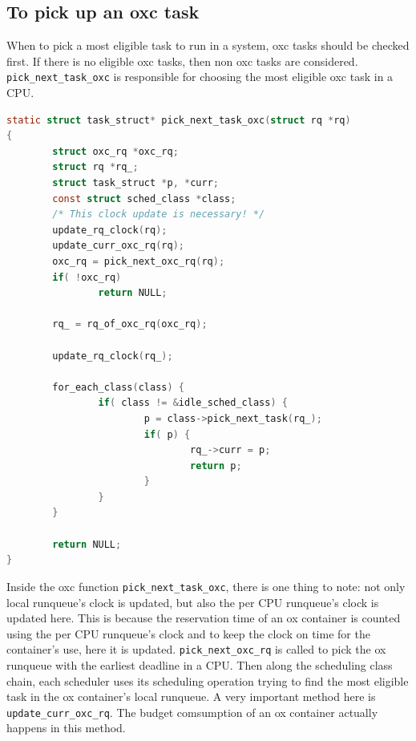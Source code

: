 \subsection{To pick up an oxc task\label{sec:pick_next_task_oxc}}

When to pick a most eligible task to run in a system, oxc tasks should 
be checked first. If there is no eligible oxc tasks, then non oxc tasks 
are considered. \texttt{pick\_next\_task\_oxc} is responsible for choosing 
the most eligible oxc task in a CPU.

\begin{lstlisting}[language=C, label={lst:pick_next_task_oxc},
		caption={Pick up the most eligible oxc task}]
static struct task_struct* pick_next_task_oxc(struct rq *rq)
{
        struct oxc_rq *oxc_rq;
        struct rq *rq_;
        struct task_struct *p, *curr;
        const struct sched_class *class;
        /* This clock update is necessary! */
        update_rq_clock(rq);
        update_curr_oxc_rq(rq);
        oxc_rq = pick_next_oxc_rq(rq);
        if( !oxc_rq)
                return NULL;

        rq_ = rq_of_oxc_rq(oxc_rq);

        update_rq_clock(rq_);

        for_each_class(class) {
                if( class != &idle_sched_class) {
                        p = class->pick_next_task(rq_);
                        if( p) {
                                rq_->curr = p;
                                return p;
                        }
                }
        }

        return NULL;
}
\end{lstlisting}

Inside the oxc function \texttt{pick\_next\_task\_oxc},
there is one thing to note: not only local runqueue's clock
is updated, but also the per CPU runqueue's clock is updated here.
This is because the reservation time of an ox container is counted
using the per CPU runqueue's clock and to keep the clock on time
for the container's use, here it is updated. 
\texttt{pick\_next\_oxc\_rq} is called to pick the ox runqueue with the 
earliest deadline in a CPU. Then along the scheduling class chain, each
scheduler uses its scheduling operation trying to find the most eligible
task in the ox container's local runqueue. A very important method here 
is \texttt{update\_curr\_oxc\_rq}. The budget comsumption of an ox 
container actually happens in this method.

